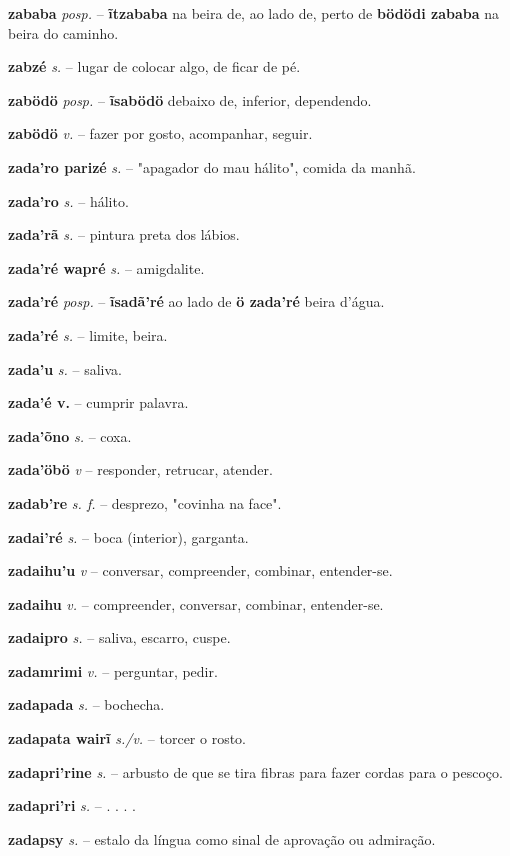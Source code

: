\textbf{zababa} \textit{posp.} -- \textbf{ĩtzababa} na beira de, ao lado de, perto de  \textbf{bödödi zababa} na beira do caminho.

\textbf{zabzé} \textit{s.} -- lugar de colocar algo, de ficar de pé.

\textbf{zabödö} \textit{posp.} -- \textbf{ĩsabödö} debaixo de, inferior, dependendo.

\textbf{zabödö} \textit{v.} -- fazer por gosto, acompanhar, seguir.

\textbf{zada'ro parizé} \textit{s.} -- "apagador do mau hálito", comida da manhã.

\textbf{zada'ro} \textit{s.} -- hálito.

\textbf{zada'rã} \textit{s.} -- pintura preta dos lábios.

\textbf{zada'ré wapré} \textit{s.} -- amigdalite.

\textbf{zada'ré} \textit{posp.} -- \textbf{ĩsadã'ré} ao lado de  \textbf{ö zada'ré} beira d'água.

\textbf{zada'ré} \textit{s.} -- limite, beira.

\textbf{zada'u} \textit{s.} -- saliva.

\textbf{zada'é v.} -- cumprir palavra.

\textbf{zada'õno} \textit{s.} -- coxa.

\textbf{zada'öbö} \textit{v} -- responder, retrucar, atender.

\textbf{zadab're} \textit{s. f.} -- desprezo, "covinha na face".

\textbf{zadai'ré} \textit{s.} -- boca (interior), garganta.

\textbf{zadaihu'u} \textit{v} -- conversar, compreender, combinar, entender-se.

\textbf{zadaihu} \textit{v.} -- compreender, conversar, combinar, entender-se.

\textbf{zadaipro} \textit{s.} -- saliva, escarro, cuspe.

\textbf{zadamrimi} \textit{v.} -- perguntar, pedir.

\textbf{zadapada} \textit{s.} -- bochecha.

\textbf{zadapata wairĩ} \textit{s./v.} -- torcer o rosto.

\textbf{zadapri'rine} \textit{s.} -- arbusto de que se tira fibras para fazer cordas para o pescoço.

\textbf{zadapri'ri} \textit{s.} -- . . . .

\textbf{zadapsy} \textit{s.} -- estalo da língua como sinal de aprovação ou admiração.

